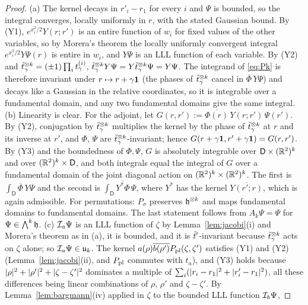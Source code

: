 \begin{proof}
(a) The kernel decays in $r'_i-r_1$ for every $i$ and $\Psi$ is bounded, so the integral converges, locally uniformly in
$r$, with the stated Gaussian bound. By (Y1), $e^{x_i^2/2}Y(r;r')$ is an entire function of $w_i$ for fixed values of the other
variables, so by Morera's theorem the locally uniformly convergent integral $e^{x_i^2/2}Y\Psi(r)$ is entire in $w_i$, and $Y\Psi$ is
an LLL function of each variable. By (Y2) and $\tilde t^{\otimes k}_\gamma=(\pm1)\prod_it^{(i)}_\gamma$,
$\tilde t^{\otimes k}_\gamma Y\Psi=Y\tilde t^{\otimes k}_\gamma\Psi=Y\Psi$. The integrand of \eqref{eq:Pk} is therefore invariant under $r\mapsto r+\gamma\mathbf{1}$
(the phases of $\tilde t^{\otimes k}_\gamma$ cancel in $\overline\Phi\,Y\Psi$) and decays like a Gaussian in the relative coordinates,
so it is integrable over a fundamental domain, and any two fundamental domains give the same integral.
(b) Linearity is clear. For the adjoint, let $G(r,r'):=\overline{\Phi(r)}\,Y(r;r')\,\Psi(r')$. By (Y2), conjugation by
$\tilde t^{\otimes k}_\gamma$ multiplies the kernel by the phase of $\tilde t^{\otimes k}_\gamma$ at $r$ and its inverse at $r'$, and $\Phi$, $\Psi$ are
$\tilde t^{\otimes k}_\gamma$-invariant; hence $G(r+\gamma\mathbf{1},r'+\gamma\mathbf{1})=G(r,r')$. By (Y3) and the boundedness of $\Phi,\Psi$, $G$ is
absolutely integrable over $\mathsf D\times(\mathbb{R}^2)^k$ and over $(\mathbb{R}^2)^k\times\mathsf D$, and both integrals equal the
integral of $G$ over a fundamental domain of the joint diagonal action on $(\mathbb{R}^2)^k\times(\mathbb{R}^2)^k$. The first is
$\int_{\mathsf D}\overline\Phi\,Y\Psi$ and the second is $\int_{\mathsf D}\overline{Y^*\Phi}\,\Psi$, where $Y^*$ has the kernel
$\overline{Y(r';r)}$, which is again admissible. For permutations: $P_\sigma$ preserves $\mathfrak{h}^{\otimes k}$ and maps
fundamental domains to fundamental domains. The last statement follows from $A_k\Psi=\Psi$ for $\Psi\in\bigwedge^k\mathfrak{h}$.
(c) $\mathcal{I}_a\Psi$ is an LLL function of $\zeta$ by Lemma~\ref{lem:jacobi}(i) and Morera's theorem as in (a), it is bounded,
and it is $\tilde t'$-invariant because $\tilde t^{\otimes k}_\gamma$ acts on $\zeta$ alone; so $\mathcal{I}_a\Psi\in\mathfrak{u}_k$. The kernel
$a(\rho)\overline{b(\rho')}P_{\mathrm{pl}}(\zeta,\zeta')$ satisfies (Y1) and (Y2) (Lemma~\ref{lem:jacobi}(ii), and $P_{\mathrm{pl}}$ commutes with $t_a$),
and (Y3) holds because $\lvert\rho\rvert^2+\lvert\rho'\rvert^2+\lvert\zeta-\zeta'\rvert^2$ dominates a multiple of
$\sum_i(\lvert r_i-r_1\rvert^2+\lvert r'_i-r_1\rvert^2)$, all these differences being linear combinations of $\rho$, $\rho'$ and
$\zeta-\zeta'$. By Lemma~\ref{lem:bargmann}(iv) applied in $\zeta$ to the bounded LLL function $\mathcal{I}_b\Psi$,

\end{proof}
